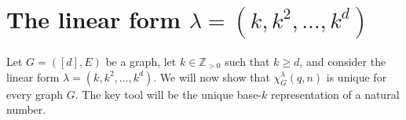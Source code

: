 \documentclass[11pt]{amsart}
\newtheorem{proposition}[theorem]{Proposition}
\begin{document}

\section{The linear form $\lambda=(k,k^2,\ldots,k^d)$}\label{sec:genericlinearform}

Let $G=([d],E)$ be a graph, let $k \in \mathbb{Z}_{>0}$ such that $k \geq d$, and consider the linear form
$\lambda=(k,k^2,\ldots,k^d)$. We will now show that $\chi_G^\lambda(q,n)$ is unique for every graph $G$. 
The key tool will be the unique base-$k$ representation of a natural number.

\end{document}
